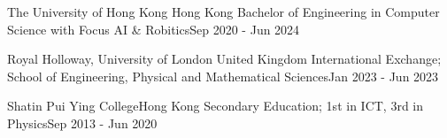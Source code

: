 \resumeSubHeadingListStart

\resumeSubheading
    {The University of Hong Kong}{ Hong Kong}
    {Bachelor of Engineering in Computer Science with Focus AI \& Robitics}{Sep 2020 - Jun 2024}
    
\resumeSubheading
    {Royal Holloway, University of London}{ United Kingdom}
    {International Exchange; School of Engineering, Physical and Mathematical Sciences}{Jan 2023 - Jun 2023}
    
\resumeSubheading
    {Shatin Pui Ying College}{Hong Kong}
    {Secondary Education;   1st in ICT, 3rd in Physics}{Sep 2013 - Jun 2020}
    
\resumeSubHeadingListEnd
